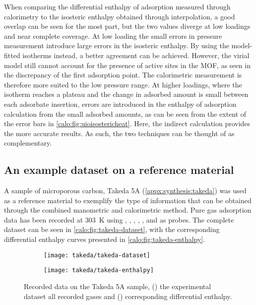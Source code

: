 When comparing the differential enthalpy of adsorption measured through
calorimetry to the isosteric enthalpy obtained through interpolation, 
a good overlap can be seen for the most part, but the two values
diverge at low loadings and near complete coverage. 
At low loading the small errors in pressure measurement introduce
large errors in the isosteric enthalpy. By using the model-fitted 
isotherms instead, a better agreement can be achieved. However, the 
virial model still cannot account for the presence of active sites in the 
\gls{MOF}, as seen in the discrepancy of the first adsorption point.
The calorimetric measurement is therefore more suited to the low pressure
range. At higher loadings, where the isotherm reaches a plateau and
the change in adsorbed amount is small between each adsorbate
insertion, errors are introduced in the enthalpy of adsorption 
calculation from the small adsorbed amounts, as can be seen from the
extent of the error bars in \autoref{calo:fig:uioisostericheat}.
Here, the indirect calculation provides the more accurate results.
As such, the two techniques can be thought of as complementary.

\subsection{An example dataset on a reference material}

A sample of microporous carbon, Takeda 5A (\autoref{appx:synthesis:takeda})
was used as a reference material to exemplify the type of information
that can be obtained through the combined manometric and 
calorimetric method. Pure gas adsorption data has been recorded at 
\SI{303}{\kelvin} using , , , , ,
 and  as probes. The complete dataset can be seen 
in \autoref{calo:fig:takeda-dataset}, with the corresponding differential 
enthalpy curves presented in \autoref{calo:fig:takeda-enthalpy}.

\begin{figure}[ht]

	\centering
	\begin{subfigure}[b]{.45\textwidth}
		\centering
		\texttt{[image: takeda/takeda-dataset]}
		\caption{}%
		\label{calo:fig:takeda-dataset}
	\end{subfigure}%
	\quad
	\begin{subfigure}[b]{.45\textwidth}
		\centering
		\texttt{[image: takeda/takeda-enthalpy]}
		\caption{}%
		\label{calo:fig:takeda-enthalpy}
	\end{subfigure}
	\caption{Recorded data on the Takeda 5A sample, 
		(\protect{}) the
		experimental dataset all recorded gases and 
		(\protect{}) 
		corresponding differential enthalpy.}%
	\label{calo:fig:takeda-data}

\end{figure}

